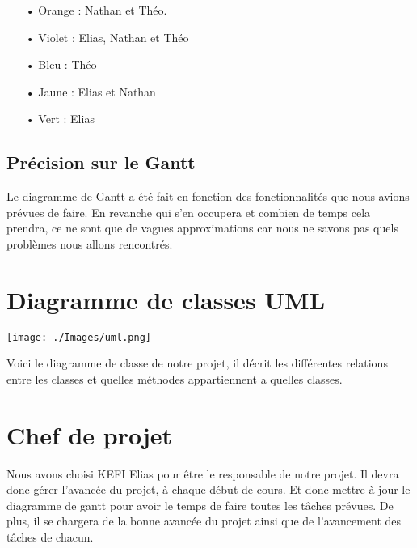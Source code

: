 \documentclass[a4paper,12pt]{article} %
\begin{document}
\begin{itemize}
\item[•] Orange : Nathan et Théo.
\item[•] Violet : Elias, Nathan et Théo
\item[•] Bleu : Théo
\item[•] Jaune : Elias et Nathan
\item[•] Vert : Elias
\end{itemize}

\subsection{Précision sur le Gantt}


Le diagramme de Gantt a été fait en fonction des fonctionnalités que nous avions prévues de faire. En revanche qui s'en occupera et combien de temps cela prendra, ce ne sont que de vagues approximations car nous ne savons pas quels problèmes nous allons rencontrés.
\newline

\section{Diagramme de classes UML}


\texttt{[image: ./Images/uml.png]}

Voici le diagramme de classe de notre projet, il décrit les différentes relations entre les classes et quelles méthodes appartiennent a quelles classes. 

\section{Chef de projet}


Nous avons choisi KEFI Elias pour être le responsable de notre projet. Il devra donc gérer l'avancée du projet, à chaque début de cours. Et donc mettre à jour le diagramme de gantt pour avoir le temps de faire toutes les tâches prévues.
\newline
De plus, il se chargera de la bonne avancée du projet ainsi que de l'avancement des tâches de chacun.
\end{document}
